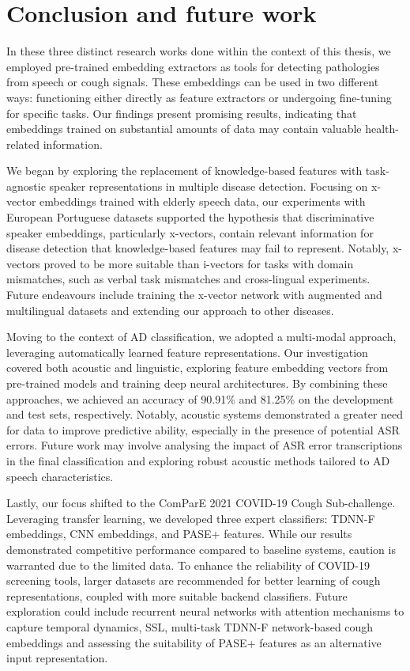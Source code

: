 \section{Conclusion and future work}
In these three distinct research works done within the context of this thesis, we employed pre-trained embedding extractors as tools for detecting pathologies from speech or cough signals. These embeddings can be used in two different ways: functioning either directly as feature extractors or undergoing fine-tuning for specific tasks. Our findings present promising results, indicating that embeddings trained on substantial amounts of data may contain valuable health-related information.

We began by exploring the replacement of knowledge-based features with task-agnostic speaker representations in multiple disease detection. Focusing on x-vector embeddings trained with elderly speech data, our experiments with European Portuguese datasets supported the hypothesis that discriminative speaker embeddings, particularly x-vectors, contain relevant information for disease detection that knowledge-based features may fail to represent. Notably, x-vectors proved to be more suitable than i-vectors for tasks with domain mismatches, such as verbal task mismatches and cross-lingual experiments. Future endeavours include training the x-vector network with augmented and multilingual datasets and extending our approach to other diseases.

Moving to the context of \ac{AD} classification, we adopted a multi-modal approach, leveraging automatically learned feature representations. Our investigation covered both acoustic and linguistic, exploring feature embedding vectors from pre-trained models and training deep neural architectures. By combining these approaches, we achieved an accuracy of 90.91\% and 81.25\% on the development and test sets, respectively. Notably, acoustic systems demonstrated a greater need for data to improve predictive ability, especially in the presence of potential \ac{ASR} errors. Future work may involve analysing the impact of \ac{ASR} error transcriptions in the final classification and exploring robust acoustic methods tailored to \ac{AD} speech characteristics.

Lastly, our focus shifted to the ComParE 2021 COVID-19 Cough Sub-challenge. Leveraging transfer learning, we developed three expert classifiers: \ac{TDNN-F} embeddings, \ac{CNN} embeddings, and \ac{PASE}+ features. While our results demonstrated competitive performance compared to baseline systems, caution is warranted due to the limited data. To enhance the reliability of COVID-19 screening tools, larger datasets are recommended for better learning of cough representations, coupled with more suitable backend classifiers. Future exploration could include recurrent neural networks with attention mechanisms to capture temporal dynamics, \ac{SSL}, multi-task \ac{TDNN-F} network-based cough embeddings and assessing the suitability of \ac{PASE}+ features as an alternative input representation.

